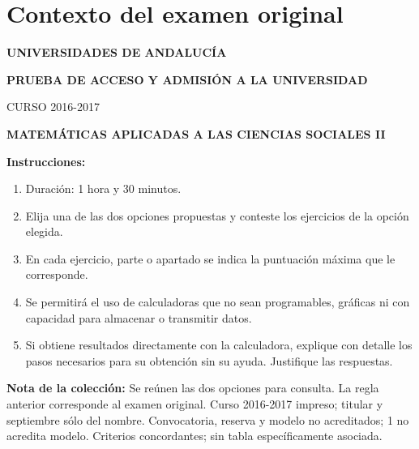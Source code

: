 \section*{Contexto del examen original}
\textbf{UNIVERSIDADES DE ANDALUCÍA}\par
\textbf{PRUEBA DE ACCESO Y ADMISIÓN A LA UNIVERSIDAD}\par
CURSO 2016-2017\par
\textbf{MATEMÁTICAS APLICADAS A LAS CIENCIAS SOCIALES II}

\textbf{Instrucciones:}
\begin{enumerate}[label=\textbf{\alph*)}]
  \item Duración: 1 hora y 30 minutos.
  \item Elija una de las dos opciones propuestas y conteste los ejercicios de la opción elegida.
  \item En cada ejercicio, parte o apartado se indica la puntuación máxima que le corresponde.
  \item Se permitirá el uso de calculadoras que no sean programables, gráficas ni con capacidad para almacenar o transmitir datos.
  \item Si obtiene resultados directamente con la calculadora, explique con detalle los pasos necesarios para su obtención sin su ayuda. Justifique las respuestas.
\end{enumerate}
\noindent\textbf{Nota de la colección:} Se reúnen las dos opciones para consulta. La regla anterior corresponde al examen original. Curso 2016-2017 impreso; titular y septiembre sólo del nombre. Convocatoria, reserva y modelo no acreditados; 1 no acredita modelo. Criterios concordantes; sin tabla específicamente asociada.
\par\medskip
